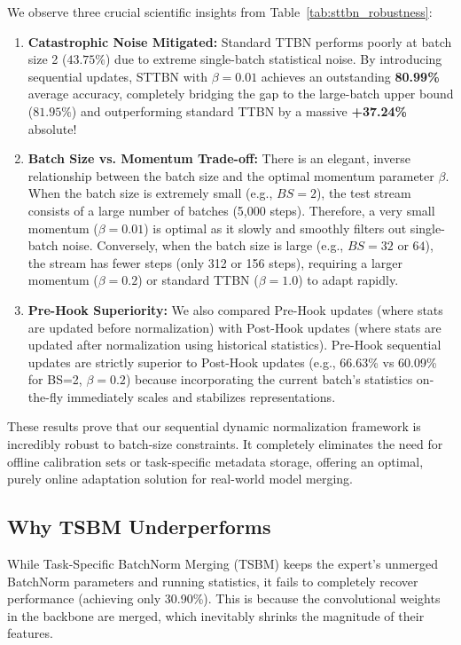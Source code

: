 \documentclass{article}
\theoremstyle{plain}
\theoremstyle{definition}
\theoremstyle{remark}
\begin{document}
We observe three crucial scientific insights from Table~\ref{tab:sttbn_robustness}:
\begin{enumerate}
    \item \textbf{Catastrophic Noise Mitigated:} Standard TTBN performs poorly at batch size 2 ($43.75\%$) due to extreme single-batch statistical noise. By introducing sequential updates, STTBN with $\beta = 0.01$ achieves an outstanding \textbf{80.99\%} average accuracy, completely bridging the gap to the large-batch upper bound ($81.95\%$) and outperforming standard TTBN by a massive \textbf{+37.24\%} absolute!
    \item \textbf{Batch Size vs. Momentum Trade-off:} There is an elegant, inverse relationship between the batch size and the optimal momentum parameter $\beta$. When the batch size is extremely small (e.g., $BS=2$), the test stream consists of a large number of batches (5,000 steps). Therefore, a very small momentum ($\beta = 0.01$) is optimal as it slowly and smoothly filters out single-batch noise. Conversely, when the batch size is large (e.g., $BS=32$ or $64$), the stream has fewer steps (only 312 or 156 steps), requiring a larger momentum ($\beta = 0.2$) or standard TTBN ($\beta = 1.0$) to adapt rapidly.
    \item \textbf{Pre-Hook Superiority:} We also compared Pre-Hook updates (where stats are updated before normalization) with Post-Hook updates (where stats are updated after normalization using historical statistics). Pre-Hook sequential updates are strictly superior to Post-Hook updates (e.g., 66.63\% vs 60.09\% for BS=2, $\beta=0.2$) because incorporating the current batch's statistics on-the-fly immediately scales and stabilizes representations.
\end{enumerate}

These results prove that our sequential dynamic normalization framework is incredibly robust to batch-size constraints. It completely eliminates the need for offline calibration sets or task-specific metadata storage, offering an optimal, purely online adaptation solution for real-world model merging.

\subsection{Why TSBM Underperforms}

While Task-Specific BatchNorm Merging (TSBM) keeps the expert's unmerged BatchNorm parameters and running statistics, it fails to completely recover performance (achieving only 30.90\%). This is because the convolutional weights in the backbone are merged, which inevitably shrinks the magnitude of their features.
\end{document}
